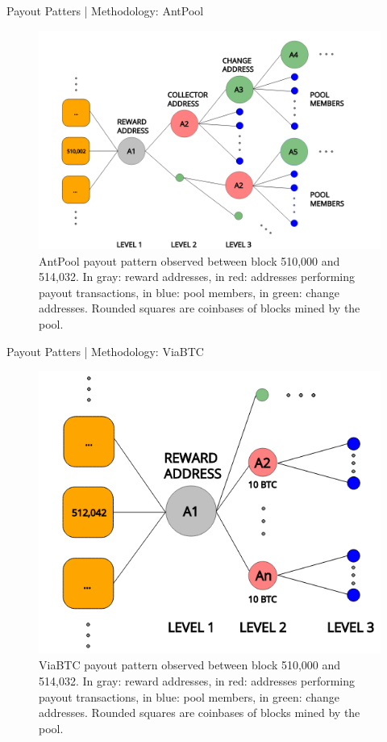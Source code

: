 \documentclass[10pt]{beamer}
\begin{document}
\begin{frame}[fragile]{Payout Patters | Methodology: AntPool}
    \begin{figure}
        \includegraphics[width=.8\textwidth]{images/flow_AntPool_example1.png}
        \caption{AntPool payout pattern observed between block 510,000 and 514,032. In gray: reward addresses, in red: addresses performing payout transactions, in blue: pool members, in green: change addresses. Rounded squares are coinbases of blocks mined by the pool.}
        \label{fig:antpool_flow}
    \end{figure}
\end{frame}

\begin{frame}[fragile]{Payout Patters | Methodology: ViaBTC}
    \begin{figure}
        \includegraphics[width=.5\textwidth]{images/flow_ViaBTC_example2.png}
        \caption{ViaBTC payout pattern observed between block 510,000 and 514,032. In gray: reward addresses, in red: addresses performing payout transactions, in blue: pool members, in green: change addresses. Rounded squares are coinbases of blocks mined by the pool.}
        \label{fig:viabtc_flow}
    \end{figure}
\end{frame}
\end{document}
